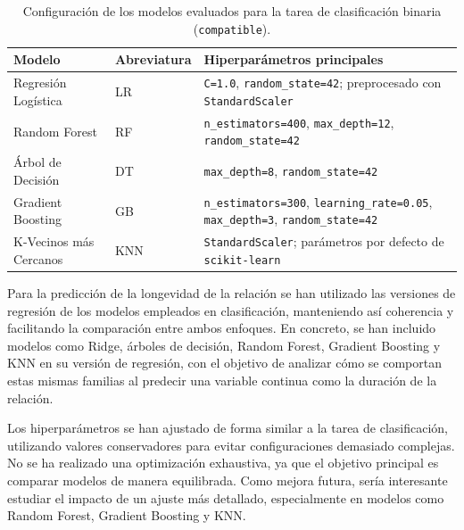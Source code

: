 \begin{table}[H]
\centering
\footnotesize
\begin{tabular}{llp{8cm}}
\hline
\textbf{Modelo} & \textbf{Abreviatura} & \textbf{Hiperparámetros principales} \\ \hline
Regresión Logística & LR & \texttt{C=1.0}, \texttt{random\_state=42}; preprocesado con \texttt{StandardScaler} \\
Random Forest & RF & \texttt{n\_estimators=400}, \texttt{max\_depth=12}, \texttt{random\_state=42} \\
Árbol de Decisión & DT & \texttt{max\_depth=8}, \texttt{random\_state=42} \\
Gradient Boosting & GB & \texttt{n\_estimators=300}, \texttt{learning\_rate=0.05}, \texttt{max\_depth=3}, \texttt{random\_state=42} \\
K-Vecinos más Cercanos & KNN & \texttt{StandardScaler}; parámetros por defecto de \texttt{scikit-learn} \\ \hline
\end{tabular}
\caption{Configuración de los modelos evaluados para la tarea de clasificación binaria (\texttt{compatible}).}
\label{tab:modelos_clasificacion}
\end{table}

Para la predicción de la longevidad de la relación se han utilizado las versiones de regresión de los modelos empleados en clasificación, manteniendo así coherencia y facilitando la comparación entre ambos enfoques. En concreto, se han incluido modelos como Ridge, árboles de decisión, Random Forest, Gradient Boosting y KNN en su versión de regresión, con el objetivo de analizar cómo se comportan estas mismas familias al predecir una variable continua como la duración de la relación.

Los hiperparámetros se han ajustado de forma similar a la tarea de clasificación, utilizando valores conservadores para evitar configuraciones demasiado complejas. No se ha realizado una optimización exhaustiva, ya que el objetivo principal es comparar modelos de manera equilibrada. Como mejora futura, sería interesante estudiar el impacto de un ajuste más detallado, especialmente en modelos como Random Forest, Gradient Boosting y KNN.

